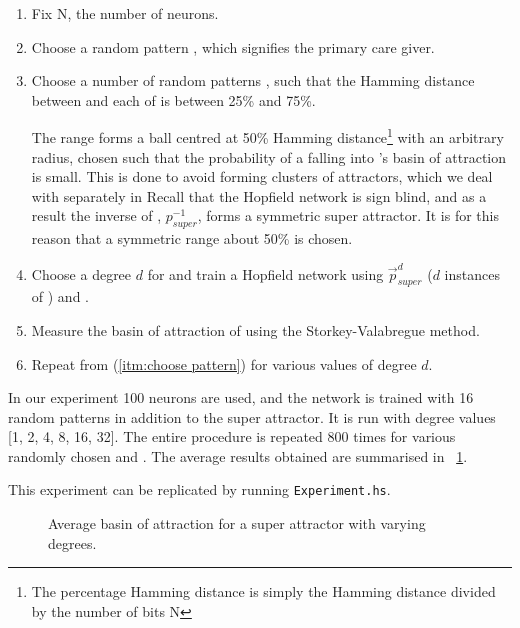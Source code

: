 \begin{enumerate}


\item Fix N, the number of neurons.

\item \label{itm:choose pattern} Choose a random pattern \psuper, which signifies the primary care giver.

\item Choose a number of random patterns \prandom, such that the Hamming distance between \psuper and each of \prandom is between 25\% and 75\%.

The range forms a ball centred at 50\% Hamming distance\footnote{The percentage Hamming distance is simply the Hamming distance divided by the number of bits N} with an arbitrary radius, chosen such that the probability of a \prandom falling into \psuper's basin of attraction is small. This is done to avoid forming clusters of attractors, which we deal with separately in  Recall that the Hopfield network is sign blind, and as a result the inverse of \psuper, $p_{super}^{-1}$, forms a symmetric super attractor. It is for this reason that a symmetric range about 50\% is chosen.

\item Choose a degree $d$ for \psuper and train a Hopfield network using $\overrightarrow{p}^d_{super}$ ($d$ instances of \psuper) and \prandom.

\item Measure the basin of attraction of \psuper using the Storkey-Valabregue method. 

\item Repeat from (\ref{itm:choose pattern}) for various values of degree $d$.

\end{enumerate}


In our experiment 100 neurons are used, and the network is trained with 16 random patterns in addition to the super attractor. It is run with degree values {[}1, 2, 4, 8, 16, 32{]}. The entire procedure is repeated 800 times for various randomly chosen \psuper and \prandom. The average results obtained are summarised in ~\ref{fig:one super plot}.

This experiment can be replicated by running \texttt{Experiment.hs}. 

\begin{figure}[h]
  \centering

\caption{Average basin of attraction for a super attractor with varying degrees.}
\label{fig:one super plot}
\end{figure}


